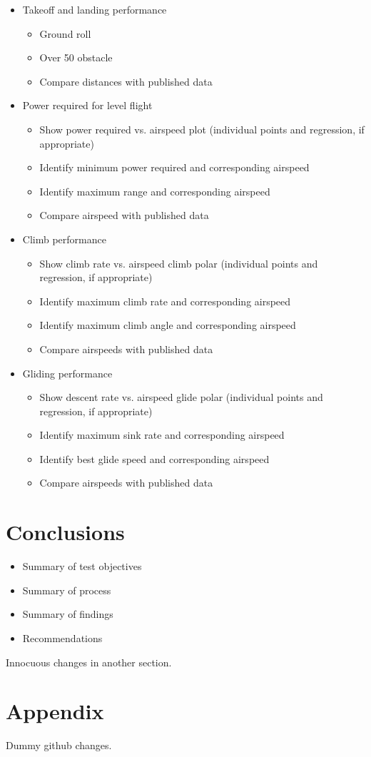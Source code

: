 \documentclass[conf]{new-aiaa}
\begin{document}
\begin{itemize}
	\item Takeoff and landing performance
	\begin{itemize}
		\item Ground roll
		\item Over \SI{50}{\foot} obstacle
		\item Compare distances with published data
	\end{itemize}
	\item Power required for level flight
	\begin{itemize}
		\item Show power required vs. airspeed plot (individual points and regression, if appropriate)
		\item Identify minimum power required and corresponding airspeed
		\item Identify maximum range and corresponding airspeed
		\item Compare airspeed with published data
	\end{itemize}
	\item Climb performance
	\begin{itemize}
		\item Show climb rate vs. airspeed climb polar (individual points and regression, if appropriate)
		\item Identify maximum climb rate and corresponding airspeed
		\item Identify maximum climb angle and corresponding airspeed
		\item Compare airspeeds with published data
	\end{itemize}
	\item Gliding performance
	\begin{itemize}
		\item Show descent rate vs. airspeed glide polar (individual points and regression, if appropriate)
		\item Identify maximum sink rate and corresponding airspeed
		\item Identify best glide speed and corresponding airspeed
		\item Compare airspeeds with published data
	\end{itemize}
\end{itemize}

\section{Conclusions}

\begin{itemize}
	\item Summary of test objectives
	\item Summary of process
	\item Summary of findings
	\item Recommendations
\end{itemize}

Innocuous changes in another section.

\section{Appendix}

Dummy github changes.
\end{document}
